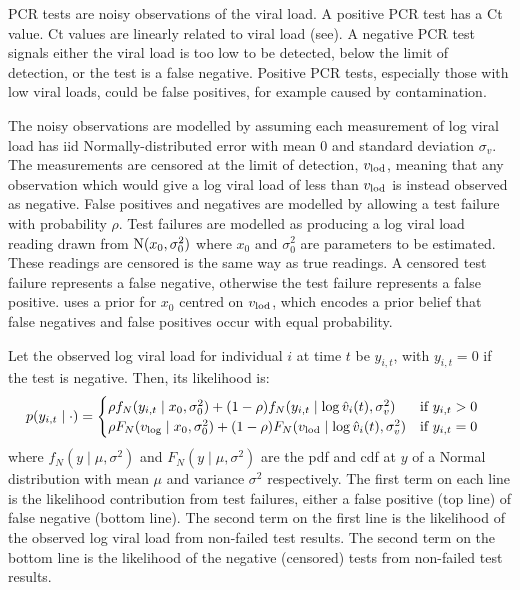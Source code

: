 \documentclass[thesis.tex]{subfiles}
\begin{document}
PCR tests are noisy observations of the viral load.
A positive PCR test has a Ct value.
Ct values are linearly related to viral load (see).
A negative PCR test signals either the viral load is too low to be detected, \ie below the limit of detection, or the test is a false negative.
Positive PCR tests, especially those with low viral loads, could be false positives, for example caused by contamination.

The noisy observations are modelled by assuming each measurement of log viral load has iid Normally-distributed error with mean 0 and standard deviation $\sigma_v$.
The measurements are censored at the limit of detection, $v_\text{lod}$, meaning that any observation which would give a log viral load of less than $v_\text{lod}$ is instead observed as negative.
False positives and negatives are modelled by allowing a test failure with probability $\rho$.
Test failures are modelled as producing a log viral load reading drawn from $\operatorname{N}(x_0, \sigma_0^2)$ where $x_0$ and $\sigma_0^2$ are parameters to be estimated.
These readings are censored is the same way as true readings.
A censored test failure represents a false negative, otherwise the test failure represents a false positive.
\textcite{hakkiOnset} uses a prior for $x_0$ centred on $v_\text{lod}$, which encodes a prior belief that false negatives and false positives occur with equal probability.

Let the observed log viral load for individual $i$ at time $t$ be $y_{i,t}$, with $y_{i,t}=0$ if the test is negative.
Then, its likelihood is:
\begin{align}
p(y_{i,t} \mid \cdot) &= \begin{cases}
    \rho f_N(y_{i,t} \mid x_0, \sigma_0^2) + (1 - \rho) f_N(y_{i,t} \mid \log \hat{v}_i(t), \sigma_v^2) & \text{if $y_{i,t} > 0$}\\
    \rho F_N(v_\text{log} \mid x_0, \sigma_0^2) + (1 - \rho) F_N(v_\text{lod} \mid \log \hat{v}_i(t), \sigma_v^2) & \text{if $y_{i,t} = 0$} \label{ATACCC:eq:hakki-likelihood}
\end{cases}
\end{align}
where $f_N(y \mid \mu, \sigma^2)$ and $F_N(y \mid \mu, \sigma^2)$ are the pdf and cdf at $y$ of a Normal distribution with mean $\mu$ and variance $\sigma^2$ respectively.
The first term on each line is the likelihood contribution from test failures, either a false positive (top line) of false negative (bottom line).
The second term on the first line is the likelihood of the observed log viral load from non-failed test results.
The second term on the bottom line is the likelihood of the negative (censored) tests from non-failed test results.
\end{document}
